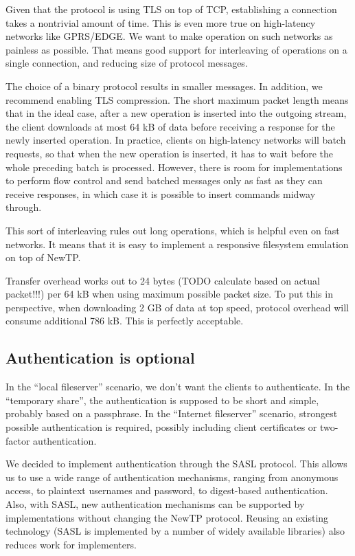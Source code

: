 Given that the protocol is using TLS on top of TCP, establishing a connection takes a nontrivial amount of
time. This is even more true on high-latency networks like GPRS/EDGE. We want to make operation on such
networks as painless as possible. That means good support for interleaving of operations on a single
connection, and reducing size of protocol messages.

The choice of a binary protocol results in smaller messages. In addition, we recommend enabling TLS
compression. The short maximum packet length means that in the ideal case, after a new operation is inserted
into the outgoing stream, the client downloads at most 64 kB of data before receiving a response for the newly
inserted operation. In practice, clients on high-latency networks will batch requests, so that when the new
operation is inserted, it has to wait before the whole preceding batch is processed. However, there is room
for implementations to perform flow control and send batched messages only as fast as they can receive
responses, in which case it is possible to insert commands midway through.

This sort of interleaving rules out long operations, which is helpful even on fast networks. It means that it
is easy to implement a responsive filesystem emulation on top of NewTP.

Transfer overhead works out to 24 bytes (TODO calculate based on actual packet!!!) per 64 kB when using
maximum possible packet size. To put this in perspective, when downloading 2 GB of data at top speed, protocol
overhead will consume additional 786 kB.  This is perfectly acceptable.

%

\subsection{Authentication is optional}

In the ``local fileserver'' scenario, we don't want the clients to authenticate. In the ``temporary share'',
the authentication is supposed to be short and simple, probably based on a passphrase. In the ``Internet
fileserver'' scenario, strongest possible authentication is required, possibly including client certificates
or two-factor authentication.

We decided to implement authentication through the SASL protocol. This allows us to use a wide range of
authentication mechanisms, ranging from anonymous access, to plaintext usernames and password, to digest-based
authentication. Also, with SASL, new authentication mechanisms can be supported by implementations without
changing the NewTP protocol. Reusing an existing technology (SASL is implemented by a number of widely
available libraries) also reduces work for implementers.

